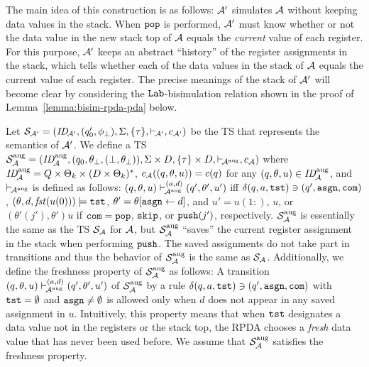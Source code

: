 The main idea of this construction is as follows:
${\cal A}'$ simulates ${\cal A}$ without keeping data values in
the stack.
When $\mathtt{pop}$ is performed,
${\cal A}'$ must know whether or not
the data value in the new stack top of ${\cal A}$
equals the \emph{current} value of each register.
For this purpose,
${\cal A}'$ keeps an abstract ``history'' of
the register assignments in the stack,
which tells whether
each of the data values in the stack of ${\cal A}$ equals
the current value of each register.
The precise meanings of the stack of ${\cal A}'$
will become clear
by considering the $\mathtt{Lab}$-bisimulation relation
shown in the proof of Lemma~\ref{lemma:bisim-rpda-pda} below.

Let %
${\cal S}_{{\cal A}'}=(\mathit{ID}_{\!{\cal A}'},(q'_0,\phi_{\bot}),\allowbreak
\Sigma,\{\tau\},{\vdash_{\!{\cal A}'}},c_{{\cal A}'})$ be the TS
that represents the semantics of ${\cal A}'$.
We define a TS
${\cal S}_{{\cal A}}^{\mathrm{aug}}=
(\mathit{ID}_{\!{\cal A}}^{\mathrm{aug}},(q_0,\theta_{\bot},(\bot,\theta_{\bot})),
\Sigma\times D,\{\tau\}\times D,{\vdash_{\!{\cal A}^{\mathrm{aug}}}},c_{{\cal A}})$
where
$\mathit{ID}_{\!{\cal A}}^{\mathrm{aug}}=Q\times\Theta_k\times(D\times\Theta_k)^*$,
$c_{{\cal A}}((q,\theta,u))=c(q)$ for
any $(q,\theta,u)\in\mathit{ID}_{\!{\cal A}}^{\mathrm{aug}}$,
and $\vdash_{\!{\cal A}^{\mathrm{aug}}}$ is defined as follows:
$(q,\theta,u)\vdash_{\!{\cal A}^{\mathrm{aug}}}^{(a,d)}(q',\theta',u')$
iff
$\delta(q,a,\mathtt{tst})\ni (q',\mathtt{asgn},\mathtt{com})$,
$(\theta,d,\mathit{fst}(u(0)))\models\mathtt{tst}$,
$\theta'=\theta[\mathtt{asgn}\gets d]$, and
$u'= u(1{:})$, $u$, or $(\theta'(j'),\theta')u$
if $\mathtt{com}=\mathtt{pop}$, $\mathtt{skip}$, or $\mathtt{push}(j')$, respectively.
${\cal S}_{{\cal A}}^{\mathrm{aug}}$ is essentially
the same as the TS ${\cal S}_{{\cal A}}$ for ${\cal A}$,
but ${\cal S}_{{\cal A}}^{\mathrm{aug}}$
``saves'' the current register assignment in the stack
when performing $\mathtt{push}$.
The saved assignments do not take part in transitions and thus
the behavior of
${\cal S}_{{\cal A}}^{\mathrm{aug}}$ is the same as ${\cal S}_{{\cal A}}$.
Additionally,
we define the freshness property of ${\cal S}_{{\cal A}}^{\mathrm{aug}}$
as follows:
A transition
$(q,\theta,u)\vdash_{\!{\cal A}^{\mathrm{aug}}}^{(a,d)}(q',\theta',u')$
of ${\cal S}_{{\cal A}}^{\mathrm{aug}}$
by a rule
$\delta(q,a,\mathtt{tst})\ni (q',\mathtt{asgn},\mathtt{com})$ with $\mathtt{tst}=\emptyset$ and
$\mathtt{asgn}\ne\emptyset$ is allowed
only when $d$ does not appear in any saved assignment in $u$.
Intuitively,
this property means that when $\mathtt{tst}$ designates a data value not in
the registers or the stack top,
the RPDA chooses a \emph{fresh} data value that has never been used before.
We assume that ${\cal S}_{{\cal A}}^{\mathrm{aug}}$ satisfies the freshness property.
